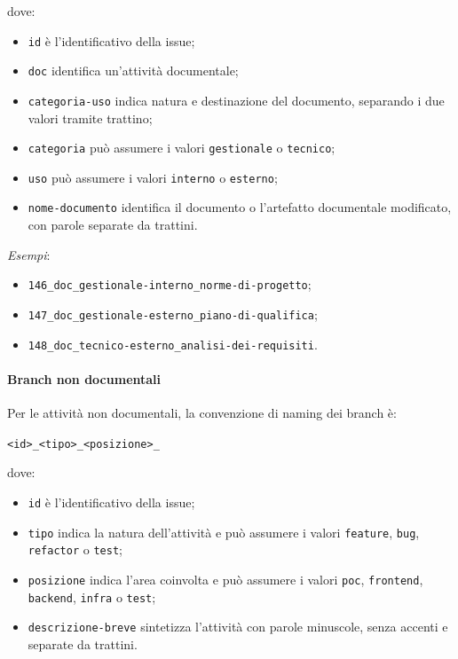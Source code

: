 dove:

\begin{itemize}
    \item \texttt{id} è l'identificativo della issue;
    \item \texttt{doc} identifica un'attività documentale;
    \item \texttt{categoria-uso} indica natura e destinazione del documento,
    separando i due valori tramite trattino;
    \item \texttt{categoria} può assumere i valori \texttt{gestionale} o
    \texttt{tecnico};
    \item \texttt{uso} può assumere i valori \texttt{interno} o \texttt{esterno};
    \item \texttt{nome-documento} identifica il documento o l'artefatto documentale
    modificato, con parole separate da trattini.
\end{itemize}

\textit{Esempi}:

\begin{itemize}
    \item \texttt{146\_doc\_gestionale-interno\_norme-di-progetto};
    \item \texttt{147\_doc\_gestionale-esterno\_piano-di-qualifica};
    \item \texttt{148\_doc\_tecnico-esterno\_analisi-dei-requisiti}.
\end{itemize}

\paragraph{Branch non documentali}

Per le attività non documentali, la convenzione di naming dei branch è:

\begin{center}
    \texttt{<id>\_<tipo>\_<posizione>\_<descrizione-breve>}
\end{center}

dove:

\begin{itemize}
    \item \texttt{id} è l'identificativo della issue;
    \item \texttt{tipo} indica la natura dell'attività e può assumere i valori
    \texttt{feature}, \texttt{bug}, \texttt{refactor} o \texttt{test};
    \item \texttt{posizione} indica l'area coinvolta e può assumere i valori
    \texttt{poc}, \texttt{frontend}, \texttt{backend}, \texttt{infra} o \texttt{test};
    \item \texttt{descrizione-breve} sintetizza l'attività con parole minuscole,
    senza accenti e separate da trattini.
\end{itemize}

